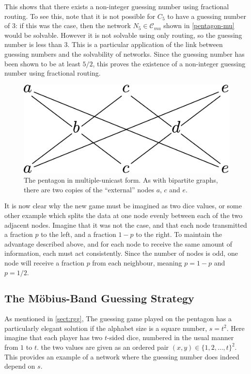 This shows that there exists a non-integer guessing number using fractional routing. To see this, note that it is not possible for $C_5$ to have a guessing number of $3$: if this was the case, then the network $N_5 \in \mathcal{C}_{mu}$ shown in \autoref{pentagon-mu} would be solvable. However it is not solvable using only routing, so the guessing number is less than $3$. This is a particular application of the link between guessing numbers and the solvability of networks. Since the guessing number has been shown to be at least $5/2$, this proves the existence of a non-integer guessing number using fractional routing.

\begin{figure}[ht]
	\centering
	\includegraphics[width=.5\textwidth]{figures/pentagon_mu.pdf}
	\caption[Pentagon problem in multiple-unicast form]{The pentagon in multiple-unicast form. As with bipartite graphs, there are two copies of the ``external'' nodes $a$, $c$ and $e$.}
	\label{pentagon-mu}
\end{figure}

It is now clear why the new game must be imagined as two dice values, or some other example which splits the data at one node evenly between each of the two adjacent nodes. Imagine that it was not the case, and that each node transmitted a fraction $p$ to the left, and a fraction $1 - p$ to the right. To maintain the advantage described above, and for each node to receive the same amount of information, each must act consistently. Since the number of nodes is odd, one node will receive a fraction $p$ from each neighbour, meaning $p = 1 - p$ and $p = 1/2$.

\subsection{The M{\"o}bius-Band Guessing Strategy}
\label{sect:pentagon-proof}

As mentioned in \autoref{sect:rgg}, The guessing game played on the pentagon has a particularly elegant solution if the alphabet size is a square number, $s = t^2$. Here imagine that each player has two $t$-sided dice, numbered in the usual manner from $1$ to $t$. the two values are given as an ordered pair $(x, y) \in \{1, 2, \dots, t\}^2$. This provides an example of a network where the guessing number does indeed depend on $s$.

